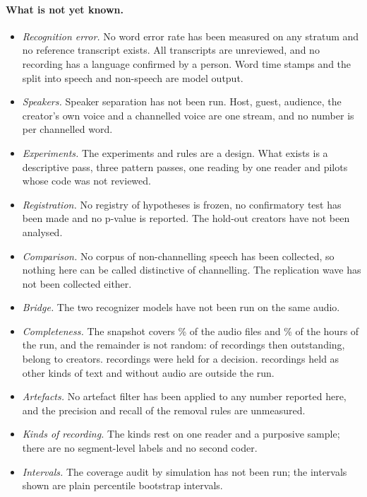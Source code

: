 \paragraph{What is not yet known.}
\begin{itemize}
\item \emph{Recognition error.} No word error rate has been measured on any stratum and no reference transcript exists. All \SnapLines{} transcripts are unreviewed, and no recording has a language confirmed by a person. Word time stamps and the split into speech and non-speech are model output.
\item \emph{Speakers.} Speaker separation has not been run. Host, guest, audience, the creator's own voice and a channelled voice are one stream, and no number is per channelled word.
\item \emph{Experiments.} The \NExperiments{} experiments and \NRules{} rules are a design. What exists is a descriptive pass, three pattern passes, one reading by one reader and pilots whose code was not reviewed.
\item \emph{Registration.} No registry of hypotheses is frozen, no confirmatory test has been made and no p-value is reported. The \NHoldout{} hold-out creators have not been analysed.
\item \emph{Comparison.} No corpus of non-channelling speech has been collected, so nothing here can be called distinctive of channelling. The replication wave has not been collected either.
\item \emph{Bridge.} The two recognizer models have not been run on the same audio.
\item \emph{Completeness.} The snapshot covers \SnapPctAudio\% of the audio files and \SnapPctHours\% of the hours of the run, and the remainder is not random: of \SnapNotInLedger{} recordings then outstanding, \SnapNotInLedgerConcentrated{} belong to \SnapNotInLedgerCreators{} creators. \SnapHeld{} recordings were held for a decision. \NOtherText{} recordings held as other kinds of text and \NFailed{} without audio are outside the run.
\item \emph{Artefacts.} No artefact filter has been applied to any number reported here, and the precision and recall of the removal rules are unmeasured.
\item \emph{Kinds of recording.} The kinds rest on one reader and a purposive sample; there are no segment-level labels and no second coder.
\item \emph{Intervals.} The coverage audit by simulation has not been run; the intervals shown are plain percentile bootstrap intervals.
\end{itemize}

